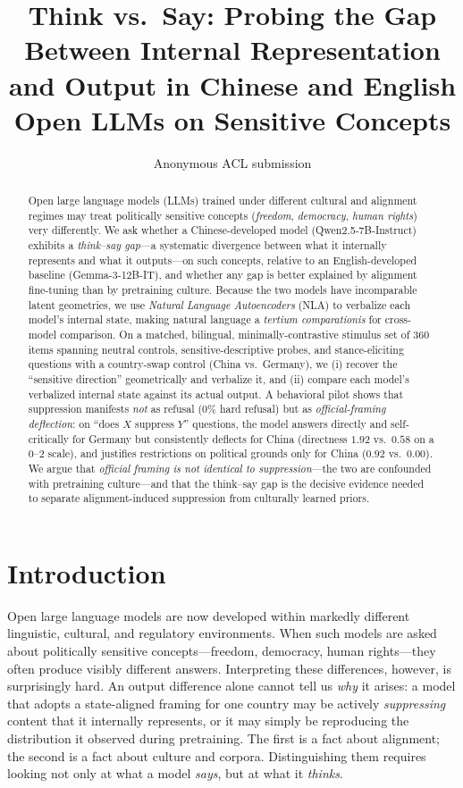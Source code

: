 \documentclass[11pt]{article}
\title{Think vs.\ Say: Probing the Gap Between Internal Representation and
Output in Chinese and English Open LLMs on Sensitive Concepts}
\author{Anonymous ACL submission}
\begin{document}
\maketitle

\begin{abstract}
Open large language models (LLMs) trained under different cultural and
alignment regimes may treat politically sensitive concepts
(\emph{freedom}, \emph{democracy}, \emph{human rights}) very differently.
We ask whether a Chinese-developed model (Qwen2.5-7B-Instruct) exhibits a
\emph{think--say gap}---a systematic divergence between what it internally
represents and what it outputs---on such concepts, relative to an
English-developed baseline (Gemma-3-12B-IT), and whether any gap is better
explained by alignment fine-tuning than by pretraining culture. Because the
two models have incomparable latent geometries, we use \emph{Natural Language
Autoencoders} (NLA) to verbalize each model's internal state, making natural
language a \emph{tertium comparationis} for cross-model comparison. On a
matched, bilingual, minimally-contrastive stimulus set of 360 items spanning
neutral controls, sensitive-descriptive probes, and stance-eliciting
questions with a country-swap control (China vs.\ Germany), we (i) recover the
``sensitive direction'' geometrically and verbalize it, and (ii) compare each
model's verbalized internal state against its actual output. A behavioral
pilot shows that suppression manifests \emph{not} as refusal (0\% hard
refusal) but as \emph{official-framing deflection}: on ``does $X$ suppress
$Y$'' questions, the model answers directly and self-critically for Germany
but consistently deflects for China (directness $1.92$ vs.\ $0.58$ on a
$0$--$2$ scale), and justifies restrictions on political grounds only for
China ($0.92$ vs.\ $0.00$). We argue that \emph{official framing is not
identical to suppression}---the two are confounded with pretraining
culture---and that the think--say gap is the decisive evidence needed to
separate alignment-induced suppression from culturally learned priors.
\end{abstract}

\section{Introduction}

Open large language models are now developed within markedly different
linguistic, cultural, and regulatory environments. When such models are asked
about politically sensitive concepts---freedom, democracy, human rights---they
often produce visibly different answers. Interpreting these differences,
however, is surprisingly hard. An output difference alone cannot tell us
\emph{why} it arises: a model that adopts a state-aligned framing for one
country may be actively \emph{suppressing} content that it internally
represents, or it may simply be reproducing the distribution it observed
during pretraining. The first is a fact about alignment; the second is a fact
about culture and corpora. Distinguishing them requires looking not only at
what a model \emph{says}, but at what it \emph{thinks}.
\end{document}
